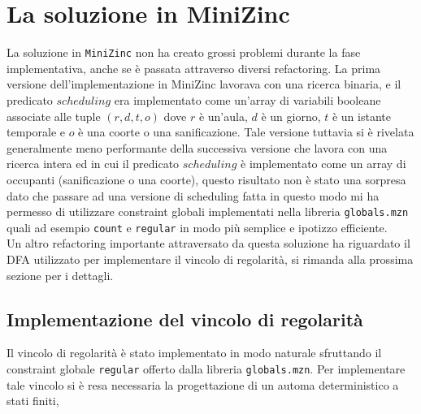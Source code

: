 \documentclass[12pt,english, openany]{book}
\begin{document}
\chapter{La soluzione in MiniZinc}
La soluzione in \texttt{MiniZinc} non ha creato grossi problemi durante la fase implementativa, anche se è passata attraverso diversi refactoring. La prima versione dell'implementazione in MiniZinc lavorava con una ricerca binaria, e il predicato $scheduling$ era implementato come un'array di variabili booleane associate alle tuple $(r,d,t,o)$ dove $r$ è un'aula, $d$ è un giorno, $t$ è un istante temporale e $o$ è una coorte o una sanificazione. 
Tale versione tuttavia si è rivelata generalmente meno performante della successiva versione che lavora con una ricerca intera ed in cui il predicato $scheduling$ è implementato come un array di occupanti (sanificazione o una coorte), questo risultato non è stato una sorpresa dato che passare ad una versione di scheduling fatta in questo modo mi ha permesso di utilizzare constraint globali implementati nella libreria \texttt{globals.mzn} quali ad esempio \texttt{count} e \texttt{regular} in modo più semplice e ipotizzo efficiente.\\
Un altro refactoring importante attraversato da questa soluzione ha riguardato il DFA utilizzato per implementare il vincolo di regolarità, si rimanda alla prossima sezione per i dettagli. 

\section{Implementazione del vincolo di regolarità}
Il vincolo di regolarità è stato implementato in modo naturale sfruttando il constraint globale \texttt{regular} offerto dalla libreria \texttt{globals.mzn}.
Per implementare tale vincolo si è resa necessaria la progettazione di un automa deterministico a stati finiti, 

\pagebreak

\renewcommand{\bibname}{References}



\vspace*{\fill}
{\hypersetup{urlcolor=black}{\scriptsize \doclicenseThis}}
\addcontentsline{toc}{chapter}{\bibname}

\pagebreak
\end{document}
